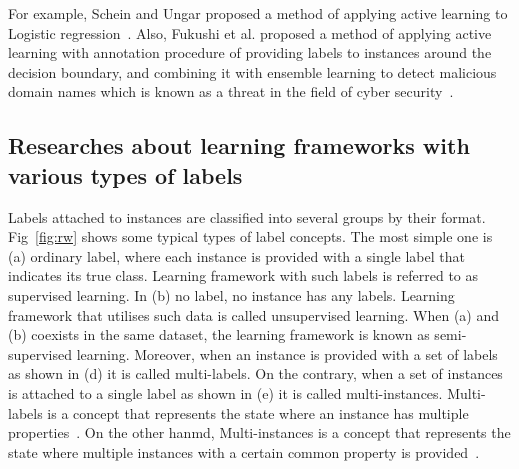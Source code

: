 \documentclass[a4paper,conference]{IEEEtran}
\begin{document}
For example, Schein and Ungar proposed a method of applying active learning to Logistic regression~\cite{Schein:2007}.
Also, Fukushi et al. proposed a method of applying active learning with annotation procedure of providing labels to instances around the decision boundary, and combining it with ensemble learning to detect malicious domain names which is known as a threat in the field of cyber security~\cite{Fukushi:2019}.

\subsection{Researches about learning frameworks with various types of labels}\label{related_comp-labels} 
Labels attached to instances are classified into several groups by their format. 
Fig~\ref{fig:rw} shows some typical types of label concepts.
The most simple one is (a) ordinary label, where each instance is provided with a single label that indicates its true class.
Learning framework with such labels is referred to as supervised learning.
In (b) no label, no instance has any labels.
Learning framework that utilises such data is called unsupervised learning.
When (a) and (b) coexists in the same dataset, the learning framework is known as semi-supervised learning. 
Moreover, when an instance is provided with a set of labels as shown in (d) it is called multi-labels. On the contrary, when a set of instances is attached to a single label as shown in (e) it is called multi-instances. 
Multi-labels is a concept that represents the state where an instance has multiple properties~\cite{Tsoumakas:2009}.
On the other hanmd, Multi-instances is a concept that represents the state where multiple instances with a certain common property is provided~\cite{Tsoumakas:2009}.
\end{document}
